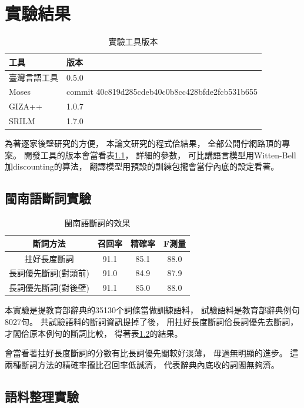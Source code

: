 \chapter{實驗結果}
\label{章：實驗結果}

\begin{table}
\caption{實驗工具版本}
\label{表：實驗工具版本}
\centering
\begin{tabular}{l|l}
工具 & 版本\\
\hline
臺灣言語工具\cite{臺灣言語工具} & 0.5.0\\
Moses\cite{Koehn:2007:MOS:1557769.1557821} & commit 40c819d285cdeb40c0b8cc428bfde2fcb531b655\\
GIZA++\cite{och2003systematic} & 1.0.7\\
SRILM\cite{stolcke2002srilm} & 1.7.0\\
\end{tabular}
\end{table}

為著逐家後壁研究的方便，
本論文研究的程式佮結果，
全部公開佇網路頂的專案\cite{翻譯研究}。
開發工具的版本會當看表\ref{表：實驗工具版本}，
詳細的參數，
可比講語言模型用Witten-Bell加discounting的算法，
翻譯模型用預設的訓練包攏會當佇內底的設定看著。
\section{閩南語斷詞實驗}
\label{節：閩南語斷詞實驗}

\begin{table}
\caption{閩南語斷詞的效果}
\label{表：閩南語斷詞的效果}
\centering
\begin{tabular}{c|ccc}
斷詞方法 & 召回率 & 精確率 & F測量\\
\hline
拄好長度斷詞 & 91.1 & 85.1 & 88.0\\
長詞優先斷詞(對頭前) & 91.0 & 84.9 & 87.9\\
長詞優先斷詞(對後壁) & 91.1 & 85.0 & 88.0\\
\end{tabular}
\end{table}

本實驗是提教育部辭典的35130个詞條當做訓練語料，
試驗語料是教育部辭典例句8027句。
共試驗語料的斷詞資訊提掉了後，
用拄好長度斷詞佮長詞優先去斷詞，
才閣佮原本例句的斷詞比較，
得著表\ref{表：閩南語斷詞的效果}的結果。

會當看著拄好長度斷詞的分數有比長詞優先閣較好淡薄，
毋過無明顯的進步。
這兩種斷詞方法的精確率攏比召回率低誠濟，
代表辭典內底收的詞閣無夠濟。

\section{語料整理實驗}
\label{節：語料整理實驗}

